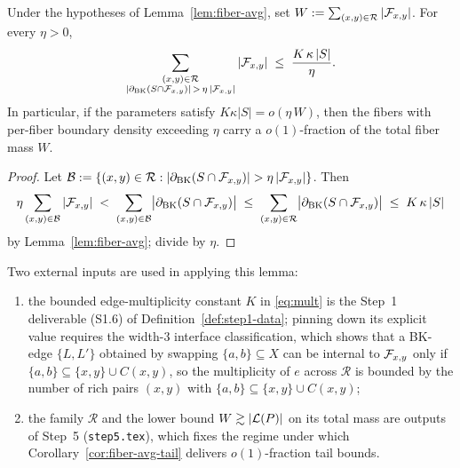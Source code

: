 \begin{corollary}\label{cor:fiber-avg-tail}
Under the hypotheses of Lemma~\ref{lem:fiber-avg}, set
$W := \sum_{(x,y)\in\mathcal{R}} |\mathcal{F}_{x,y}|$. For every $\eta>0$,
\[
\sum_{\substack{(x,y)\in\mathcal{R} \\
                |\partial_{\mathrm{BK}}(S\cap\mathcal{F}_{x,y})|\,>\,\eta\,|\mathcal{F}_{x,y}|}}
  |\mathcal{F}_{x,y}|
\;\le\; \frac{K\,\kappa\,|S|}{\eta}.
\]
In particular, if the parameters satisfy $K\kappa|S| = o(\eta\,W)$, then the fibers
with per-fiber boundary density exceeding $\eta$ carry a $o(1)$-fraction of the
total fiber mass $W$.
\end{corollary}

\begin{proof}
Let $\mathcal{B} := \{(x,y)\in\mathcal{R} :
  |\partial_{\mathrm{BK}}(S\cap\mathcal{F}_{x,y})| > \eta\,|\mathcal{F}_{x,y}|\}$. Then
\[
\eta\sum_{(x,y)\in\mathcal{B}}|\mathcal{F}_{x,y}|
  \;<\; \sum_{(x,y)\in\mathcal{B}} \bigl|\partial_{\mathrm{BK}}(S\cap\mathcal{F}_{x,y})\bigr|
  \;\le\; \sum_{(x,y)\in\mathcal{R}} \bigl|\partial_{\mathrm{BK}}(S\cap\mathcal{F}_{x,y})\bigr|
  \;\le\; K\,\kappa\,|S|
\]
by Lemma~\ref{lem:fiber-avg}; divide by $\eta$.
\end{proof}

 Two external inputs are used in applying this lemma:
\begin{enumerate}[label=(\roman*),nosep]
\item the bounded edge-multiplicity constant $K$ in \eqref{eq:mult} is the
      Step~1 deliverable (S1.6) of Definition~\ref{def:step1-data}; pinning
      down its explicit value requires the width-$3$
      interface classification, which shows that a BK-edge $\{L,L'\}$ obtained
      by swapping $\{a,b\}\subseteq X$ can be internal to $\mathcal{F}_{x,y}$ only if
      $\{a,b\}\subseteq\{x,y\}\cup C(x,y)$, so the multiplicity of $e$ across
      $\mathcal{R}$ is bounded by the number of rich pairs $(x,y)$ with
      $\{a,b\}\subseteq\{x,y\}\cup C(x,y)$;
\item the family $\mathcal{R}$ and the lower bound $W\gtrsim|\mathcal{L}(P)|$ on its
      total mass are outputs of Step~5 (\texttt{step5.tex}), which fixes the
      regime under which Corollary~\ref{cor:fiber-avg-tail} delivers
      $o(1)$-fraction tail bounds.
\end{enumerate}

